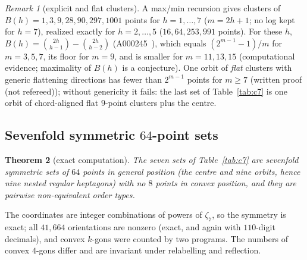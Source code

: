 \documentclass[10pt]{article}
\newtheorem{theorem}{Theorem}[section]
\theoremstyle{definition}
\theoremstyle{remark}
\newtheorem{remark}[theorem]{Remark}
\begin{document}
\begin{remark}[explicit and flat clusters]\label{rem:rule}
A max/min recursion gives clusters of $B(h)=1,3,9,28,90,297,1001$ points for $h=1,\dots,7$ ($m=2h+1$; no log kept for
$h=7$), realized exactly for $h=2,\dots,5$ ($16,64,253,991$ points). For these $h$, $B(h)=\binom{2h}{h-1}-\binom{2h}{h-2}$
(A000245~\cite{OEIS}), which equals $(2^{m-1}-1)/m$ for $m=3,5,7$, its floor for $m=9$, and is smaller for $m=11,13,15$
(computational evidence; maximality of $B(h)$ is a conjecture). One orbit of \emph{flat} clusters with generic flattening directions has fewer than $2^{m-1}$ points for
$m\ge7$ (written proof (not refereed)); without genericity it fails: the last set of Table~\ref{tab:c7} is one orbit of
chord-aligned flat $9$-point clusters plus the centre.
\end{remark}

\subsection{Sevenfold symmetric \texorpdfstring{$64$}{64}-point sets}

\begin{theorem}[exact computation]\label{thm:c7}
The seven sets of Table~\ref{tab:c7} are sevenfold symmetric sets of $64$ points in general position (the centre and
nine orbits, hence nine nested regular heptagons) with no $8$ points in convex position, and they are pairwise
non-equivalent order types.
\end{theorem}

The coordinates are integer combinations of powers of $\zeta_7$, so the symmetry is exact; all $41{,}664$ orientations
are nonzero (exact, and again with $110$-digit decimals), and convex $k$-gons were counted by two programs. The numbers
of convex $4$-gons differ and are invariant under relabelling and reflection.
\end{document}
